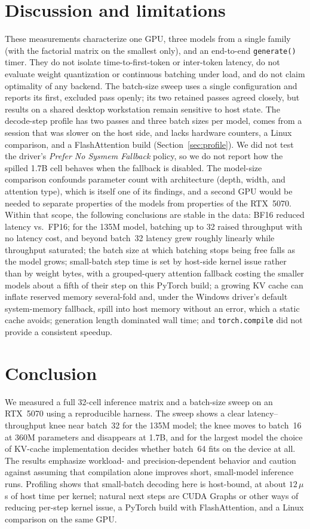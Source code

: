\documentclass[11pt]{article}
\begin{document}
\section{Discussion and limitations}
These measurements characterize one GPU, three models from a single family (with the factorial matrix on the smallest only), and an end-to-end \texttt{generate()} timer.
They do not isolate time-to-first-token or inter-token latency, do not evaluate weight quantization or continuous batching under load, and do not claim optimality of any backend.
The batch-size sweep uses a single configuration and reports its first, excluded pass openly; its two retained passes agreed closely, but results on a shared desktop workstation remain sensitive to host state.
The decode-step profile has two passes and three batch sizes per model, comes from a session that was slower on the host side, and lacks hardware counters, a Linux comparison, and a FlashAttention build (Section~\ref{sec:profile}).
We did not test the driver's \emph{Prefer No Sysmem Fallback} policy, so we do not report how the spilled 1.7B cell behaves when the fallback is disabled.
The model-size comparison confounds parameter count with architecture (depth, width, and attention type), which is itself one of its findings, and a second GPU would be needed to separate properties of the models from properties of the RTX~5070.
Within that scope, the following conclusions are stable in the data: BF16 reduced latency vs.\ FP16; for the 135M model, batching up to 32 raised throughput with no latency cost, and beyond batch~32 latency grew roughly linearly while throughput saturated; the batch size at which batching stops being free falls as the model grows; small-batch step time is set by host-side kernel issue rather than by weight bytes, with a grouped-query attention fallback costing the smaller models about a fifth of their step on this PyTorch build; a growing KV cache can inflate reserved memory several-fold and, under the Windows driver's default system-memory fallback, spill into host memory without an error, which a static cache avoids; generation length dominated wall time; and \texttt{torch.compile} did not provide a consistent speedup.

\section{Conclusion}
We measured a full 32-cell inference matrix and a batch-size sweep on an RTX~5070 using a reproducible harness.
The sweep shows a clear latency--throughput knee near batch~32 for the 135M model; the knee moves to batch~16 at 360M parameters and disappears at 1.7B, and for the largest model the choice of KV-cache implementation decides whether batch~64 fits on the device at all.
The results emphasize workload- and precision-dependent behavior and caution against assuming that compilation alone improves short, small-model inference runs.
Profiling shows that small-batch decoding here is host-bound, at about $12\,\mu$s of host time per kernel; natural next steps are CUDA Graphs or other ways of reducing per-step kernel issue, a PyTorch build with FlashAttention, and a Linux comparison on the same GPU.
\end{document}
